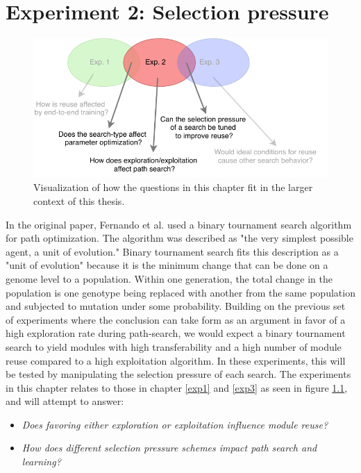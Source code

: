 \chapter{Experiment 2: Selection pressure}
\label{exp2}

\begin{figure}[hb]
    \includegraphics[width=\textwidth]{Chapters/4.Experiments/exp2/figures/exp2.pdf}
    \caption[Experiment focus]{Visualization of how the questions in this chapter fit in the larger context of this thesis.}
    \label{fig:exp2.questions}
\end{figure}
\noindent
In the original paper, Fernando et al.\cite{pathnet} used a binary tournament search algorithm for path optimization. The algorithm was described as "the very simplest possible agent, a unit of evolution." Binary tournament search fits this description as a "unit of evolution" because it is the minimum change that can be done on a genome level to a population. Within one generation, the total change in the population is one genotype being replaced with another from the same population and subjected to mutation under some probability. Building on the previous set of experiments where the conclusion can take form as an argument in favor of a high exploration rate during path-search, we would expect a binary tournament search to yield modules with high transferability and a high number of module reuse compared to a high exploitation algorithm. In these experiments, this will be tested by manipulating the selection pressure of each search. The experiments in this chapter relates to those in chapter \ref{exp1} and \ref{exp3} as seen in figure \ref{fig:exp2.questions}, and will attempt to answer: 
\begin{itemize}
    \item \emph{Does favoring either exploration or exploitation influence module reuse?}
    \item \emph{How does different selection pressure schemes impact path search and learning?}
\end{itemize}



